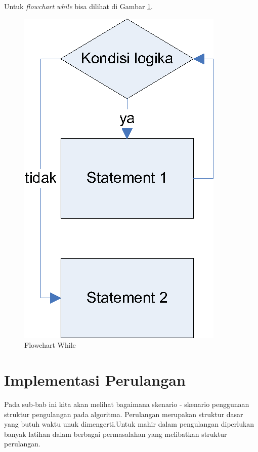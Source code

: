 \newpage
Untuk \textit{flowchart} \textit{while} bisa dilihat di Gambar \ref{fig:flowchartWhile}.
\begin{figure}[h!]%
\centering
\includegraphics[scale=0.6]{fig/flowchart-WHILE.eps}%
\caption{Flowchart While}%
\label{fig:flowchartWhile}%
\end{figure}


\section{Implementasi Perulangan}
Pada sub-bab ini kita akan melihat bagaimana skenario - skenario penggunaan struktur pengulangan pada algoritma. Perulangan merupakan struktur dasar yang butuh waktu unuk dimengerti.Untuk mahir dalam pengulangan diperlukan banyak latihan dalam berbagai permasalahan yang melibatkan struktur perulangan.

